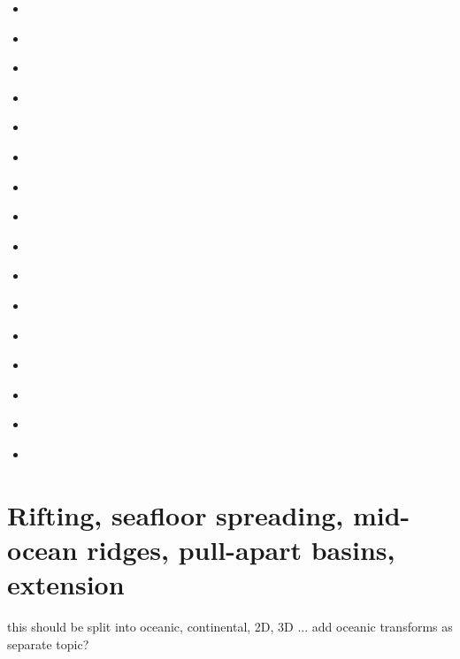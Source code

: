 \begin{scriptsize}
\begin{itemize}
\textcite{rydr00} 
\textcite{rana00} 
\textcite{meko00a} 
\textcite{meko00b} 
\item[\twothousandone] 
\textcite{lova01} 
\textcite{kary01} 
\textcite{hitd01} 
\item[\twothousandtwo] 
\textcite{hirt02} 
\item[\twothousandthree] 
\textcite{hiko03} 
\textcite{kaju03} 
\textcite{mohi03} 
\textcite{rana03} 
\textcite{buro03} 
\item[\twothousandfour] 
\textcite{gulj04} 
\item[\twothousandfive] 
\textcite{didr05} 
\textcite{drur05} 
\item[\twothousandsix] 
\textcite{rygw06} 
\textcite{buwa06} 
\textcite{momu06} 
\textcite{liwr06} 
\item[\twothousandseven] 
\textcite{hirw07} 
\textcite{kohl07} 
\textcite{faja07} 
\textcite{prgg07} 
\item[\twothousandeight] 
\textcite{lemm08} 
\textcite{budr08} 
\textcite{koka08} 
\textcite{gird08} 
\item[\twothousandnine] 
\textcite{kayk09} 
\textcite{kako09} 
\textcite{prgu09} 
\item[\twothousandeleven] 
\textcite{lell11} 
\textcite{kemk11} 
\textcite{hazk11} 
\item[\twothousandtwelve] 
\textcite{reyn12} 
\textcite{hazd12} 
\item[\twothousandthirteen] 
\textcite{lepo13} 
\textcite{miam13} 
\textcite{mont13} 
\item[\twothousandfourteen] 
\textcite{codb14} 
\item[\twothousandfifteen] 
\textcite{chpe15} 
\textcite{ohkh15} 
\item[\twothousandseventeen] 
\textcite{bocc17} 
\item[\twothousandnineteen] 
\textcite{rejv19} 
\textcite{hakt19} 
\textcite{gocg19} 
\end{itemize}
\end{scriptsize}

\section{Rifting, seafloor spreading, mid-ocean ridges, pull-apart basins, extension}

{\color{red} this should be split into oceanic, continental, 2D, 3D ...}
add oceanic transforms as separate topic?

